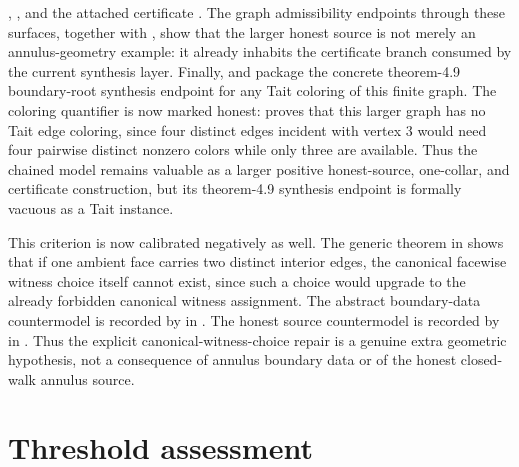 \documentclass[11pt]{article}
\begin{document}
,
, and the attached
certificate
.  The graph
admissibility endpoints through these surfaces, together with
,
show that the larger honest source is not merely an annulus-geometry example:
it already inhabits the certificate branch consumed by the current synthesis
layer.  Finally,
and
package the concrete theorem-4.9 boundary-root synthesis endpoint for any Tait
coloring of this finite graph.  The coloring quantifier is now marked honest:
 proves
that this larger graph has no Tait edge coloring, since four distinct edges
incident with vertex \(3\) would need four pairwise distinct nonzero colors
while only three are available.  Thus the chained model remains valuable as a
larger positive honest-source, one-collar, and certificate construction, but
its theorem-4.9 synthesis endpoint is formally vacuous as a Tait instance.

This criterion is now calibrated negatively as well.  The generic theorem
in  shows that if one ambient
face carries two distinct interior edges, the canonical facewise witness choice
itself cannot exist, since such a choice would upgrade to the already
forbidden canonical witness assignment.  The abstract boundary-data
countermodel is recorded by
in .  The honest
source countermodel is recorded by
in .  Thus
the explicit canonical-witness-choice repair is a genuine extra geometric
hypothesis, not a consequence of annulus boundary data or of the honest
closed-walk annulus source.

\section{Threshold assessment}
\end{document}
